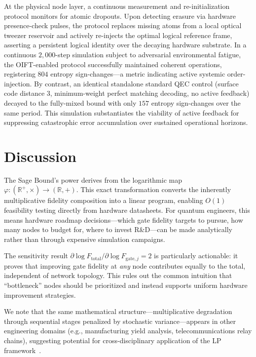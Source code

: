 \documentclass[aps,pra,reprint,amsmath,amssymb,superscriptaddress]{revtex4-2}
\begin{document}
At the physical node layer, a continuous measurement and re-initialization protocol monitors for atomic dropouts. Upon detecting erasure via hardware presence-check pulses, the protocol replaces missing atoms from a local optical tweezer reservoir and actively re-injects the optimal logical reference frame, asserting a persistent logical identity over the decaying hardware substrate. In a continuous $2{,}000$-step simulation subject to adversarial environmental fatigue, the OIFT-enabled protocol successfully maintained coherent operations, registering $804$ entropy sign-changes---a metric indicating active systemic order-injection. By contrast, an identical standalone standard QEC control (surface code distance $3$, minimum-weight perfect matching decoding, no active feedback) decayed to the fully-mixed bound with only $157$ entropy sign-changes over the same period. This simulation substantiates the viability of active feedback for suppressing catastrophic error accumulation over sustained operational horizons.



\section{Discussion}


The Sage Bound's power derives from the logarithmic map $\varphi: (\mathbb{R}^+, \times) \to (\mathbb{R}, +)$. This exact transformation converts the inherently multiplicative fidelity composition into a linear program, enabling $O(1)$ feasibility testing directly from hardware datasheets. For quantum engineers, this means hardware roadmap decisions---which gate fidelity targets to pursue, how many nodes to budget for, where to invest R\&D---can be made analytically rather than through expensive simulation campaigns.

The sensitivity result $\partial \log F_{\text{total}} / \partial \log F_{\text{gate},j} = 2$ is particularly actionable: it proves that improving gate fidelity at \emph{any} node contributes equally to the total, independent of network topology. This rules out the common intuition that ``bottleneck'' nodes should be prioritized and instead supports uniform hardware improvement strategies.

We note that the same mathematical structure---multiplicative degradation through sequential stages penalized by stochastic variance---appears in other engineering domains (e.g., manufacturing yield analysis, telecommunications relay chains), suggesting potential for cross-disciplinary application of the LP framework~\cite{muralidharan2016}.
\end{document}
